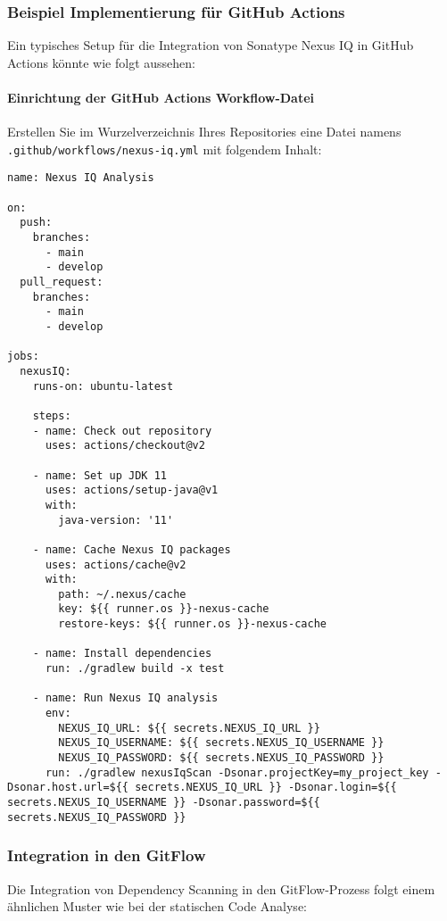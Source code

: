 \subsubsection{Beispiel Implementierung für GitHub Actions}

Ein typisches Setup für die Integration von Sonatype Nexus IQ in GitHub Actions könnte wie folgt aussehen:

\paragraph{Einrichtung der GitHub Actions Workflow-Datei}

Erstellen Sie im Wurzelverzeichnis Ihres Repositories eine Datei namens \texttt{.github/workflows/nexus-iq.yml} mit folgendem Inhalt:

\begin{lstlisting}
name: Nexus IQ Analysis

on:
  push:
    branches:
      - main
      - develop
  pull_request:
    branches:
      - main
      - develop

jobs:
  nexusIQ:
    runs-on: ubuntu-latest

    steps:
    - name: Check out repository
      uses: actions/checkout@v2

    - name: Set up JDK 11
      uses: actions/setup-java@v1
      with:
        java-version: '11'

    - name: Cache Nexus IQ packages
      uses: actions/cache@v2
      with:
        path: ~/.nexus/cache
        key: ${{ runner.os }}-nexus-cache
        restore-keys: ${{ runner.os }}-nexus-cache

    - name: Install dependencies
      run: ./gradlew build -x test

    - name: Run Nexus IQ analysis
      env:
        NEXUS_IQ_URL: ${{ secrets.NEXUS_IQ_URL }}
        NEXUS_IQ_USERNAME: ${{ secrets.NEXUS_IQ_USERNAME }}
        NEXUS_IQ_PASSWORD: ${{ secrets.NEXUS_IQ_PASSWORD }}
      run: ./gradlew nexusIqScan -Dsonar.projectKey=my_project_key -Dsonar.host.url=${{ secrets.NEXUS_IQ_URL }} -Dsonar.login=${{ secrets.NEXUS_IQ_USERNAME }} -Dsonar.password=${{ secrets.NEXUS_IQ_PASSWORD }}
\end{lstlisting}

\subsubsection{Integration in den GitFlow}

Die Integration von Dependency Scanning in den GitFlow-Prozess folgt einem ähnlichen Muster wie bei der statischen Code Analyse:

